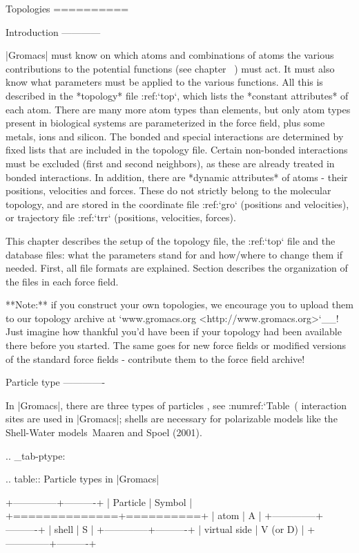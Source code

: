 Topologies
==========

Introduction
------------

|Gromacs| must know on which atoms and combinations of atoms the various
contributions to the potential functions (see
chapter 
) must act. It must also know what
parameters
must be applied to the various
functions. All this is described in the
*topology* file :ref:`top`,
which lists the *constant attributes* of each atom. There are many more
atom types than elements, but only atom types present in biological
systems are parameterized in the force field, plus some metals, ions and
silicon. The bonded and special interactions are determined by fixed
lists that are included in the topology file. Certain non-bonded
interactions must be excluded (first and second neighbors), as these are
already treated in bonded interactions. In addition, there are *dynamic
attributes* of atoms - their positions, velocities and forces. These do
not strictly belong to the molecular topology, and are stored in the
coordinate file :ref:`gro` (positions and velocities), or
trajectory file :ref:`trr` (positions, velocities, forces).

This chapter describes the setup of the topology file, the
:ref:`top` file and the database files: what the parameters
stand for and how/where to change them if needed. First, all file
formats are explained. Section 
describes the organization of the files in each force field.

**Note:** if you construct your own topologies, we encourage you to
upload them to our topology archive at
`www.gromacs.org <http://www.gromacs.org>`__! Just imagine how thankful
you’d have been if your topology had been available there before you
started. The same goes for new force fields or modified versions of the
standard force fields - contribute them to the force field archive!

Particle type
-------------

In |Gromacs|, there are three types of
particles
, see :numref:`Table (%
interaction sites are used in |Gromacs|; shells are necessary for
polarizable models like the Shell-Water models Maaren and Spoel (2001).

.. _tab-ptype:

.. table:: Particle types in |Gromacs|

           +--------------+----------+
           | Particle     | Symbol   |
           +==============+==========+
           | atom         | A        |
           +--------------+----------+
           | shell        | S        |
           +--------------+----------+
           | virtual side | V (or D) |
           +--------------+----------+


